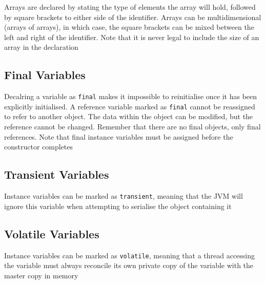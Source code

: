 Arrays are declared by stating the type of elements the array will hold, 
followed by square brackets to either side of the identifier. Arrays can be 
multidimensional (arrays of arrays), in which case, the square brackets can be 
mixed between the left and right of the identifier. Note that it is never legal 
to include the size of an array in the declaration

\subsection{Final Variables}
Decalring a variable as \verb#final# makes it impossible to reinitialise once 
it has been explicitly initialised. A reference variable marked as \verb#final# 
cannot be reassigned to refer to another object. The data within the object can 
be modified, but the reference cannot be changed. Remember that there are no 
final objects, only final references. Note that final instance variables must 
be assigned before the constructor completes

\subsection{Transient Variables}
Instance variables can be marked as \verb#transient#, meaning that the JVM will 
ignore this variable when attempting to serialise the object containing it

\subsection{Volatile Variables}
Instance variables can be marked as \verb#volatile#, meaning that a thread 
accessing the variable must always reconcile its own private copy of the 
variable with the master copy in memory

